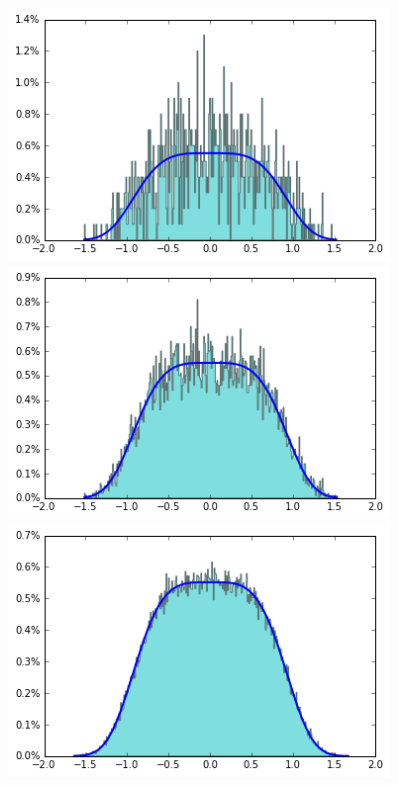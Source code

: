 \documentclass[final]{beamer}
\newlength{\sepwid}
\newlength{\onecolwid}
\begin{document}
\begin{frame}[t]
\begin{columns}[t]
\begin{column}{\onecolwid}

\end{column} %

\begin{column}{\sepwid}\end{column} %

\begin{column}{\onecolwid} %


\begin{figure}
    \centering
    \includegraphics[width=.3\onecolwid]{../figure/case1_step_0.005_iter_1e3.png}
    \includegraphics[width=.3\onecolwid]{../figure/case1_step_0.005_iter_1e4.png}
    \includegraphics[width=.3\onecolwid]{../figure/case1_step_0.005_iter_1e5.png}\\

\end{figure}
\end{column}
\end{columns}
\end{frame}
\end{document}
